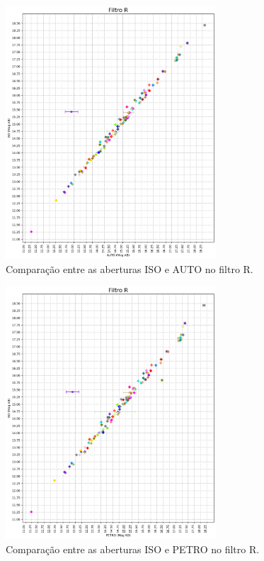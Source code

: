\begin{figure}
  \centering 
  \includegraphics[width=0.7\textwidth]{Imagens/r_iso_auto_R.png} 
  \caption[Comparação entre as aberturas ISO e AUTO no filtro R.]{Comparação entre as aberturas ISO e AUTO no filtro R.}
  \label{fig:r_iso_auto_R} 
\end{figure}

\begin{figure}
  \centering 
  \includegraphics[width=0.7\textwidth]{Imagens/r_iso_petro.png} 
  \caption[Comparação entre as aberturas ISO e PETRO no filtro R.]{Comparação entre as aberturas ISO e PETRO no filtro R.}
  \label{fig:r_iso_petro}
\end{figure}

